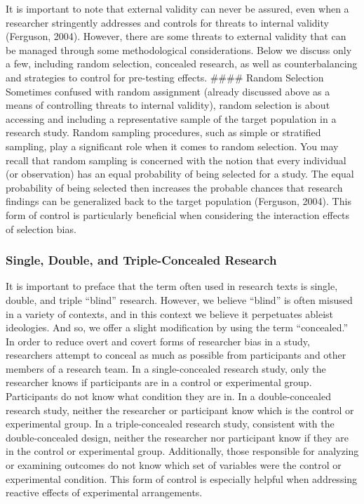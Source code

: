 \documentclass[
  11pt,
]{book}
\begin{document}
It is important to note that external validity can never be assured, even when a researcher stringently addresses and controls for threats to internal validity (Ferguson, 2004). However, there are some threats to external validity that can be managed through some methodological considerations. Below we discuss only a few, including random selection, concealed research, as well as counterbalancing and strategies to control for pre-testing effects. \#\#\#\# Random Selection Sometimes confused with random assignment (already discussed above as a means of controlling threats to internal validity), random selection is about accessing and including a representative sample of the target population in a research study. Random sampling procedures, such as simple or stratified sampling, play a significant role when it comes to random selection. You may recall that random sampling is concerned with the notion that every individual (or observation) has an equal probability of being selected for a study. The equal probability of being selected then increases the probable chances that research findings can be generalized back to the target population (Ferguson, 2004). This form of control is particularly beneficial when considering the interaction effects of selection bias.

\subsubsection{Single, Double, and Triple-Concealed Research}\label{single-double-and-triple-concealed-research}

It is important to preface that the term often used in research texts is single, double, and triple ``blind'' research. However, we believe ``blind'' is often misused in a variety of contexts, and in this context we believe it perpetuates ableist ideologies. And so, we offer a slight modification by using the term ``concealed.'' In order to reduce overt and covert forms of researcher bias in a study, researchers attempt to conceal as much as possible from participants and other members of a research team. In a single-concealed research study, only the researcher knows if participants are in a control or experimental group. Participants do not know what condition they are in. In a double-concealed research study, neither the researcher or participant know which is the control or experimental group. In a triple-concealed research study, consistent with the double-concealed design, neither the researcher nor participant know if they are in the control or experimental group. Additionally, those responsible for analyzing or examining outcomes do not know which set of variables were the control or experimental condition. This form of control is especially helpful when addressing reactive effects of experimental arrangements.
\end{document}
